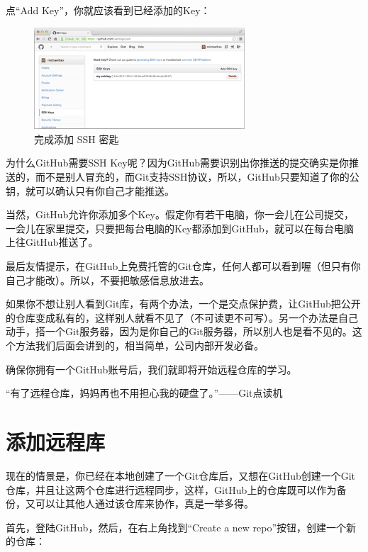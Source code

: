 点“Add Key”，你就应该看到已经添加的Key：

\begin{figure}[h]
  \centering
  \includegraphics[width=0.7\textwidth]{img/github-addkey-2.png}
  \caption{完成添加 SSH 密匙}
  \label{fig:mesh1}
\end{figure}

为什么GitHub需要SSH Key呢？因为GitHub需要识别出你推送的提交确实是你推送的，而不是别人冒充的，而Git支持SSH协议，所以，GitHub只要知道了你的公钥，就可以确认只有你自己才能推送。

当然，GitHub允许你添加多个Key。假定你有若干电脑，你一会儿在公司提交，一会儿在家里提交，只要把每台电脑的Key都添加到GitHub，就可以在每台电脑上往GitHub推送了。

最后友情提示，在GitHub上免费托管的Git仓库，任何人都可以看到喔（但只有你自己才能改）。所以，不要把敏感信息放进去。

如果你不想让别人看到Git库，有两个办法，一个是交点保护费，让GitHub把公开的仓库变成私有的，这样别人就看不见了（不可读更不可写）。另一个办法是自己动手，搭一个Git服务器，因为是你自己的Git服务器，所以别人也是看不见的。这个方法我们后面会讲到的，相当简单，公司内部开发必备。

确保你拥有一个GitHub账号后，我们就即将开始远程仓库的学习。


\begin{tcolorbox}

“有了远程仓库，妈妈再也不用担心我的硬盘了。”——Git点读机
\end{tcolorbox}

\section{添加远程库}
现在的情景是，你已经在本地创建了一个Git仓库后，又想在GitHub创建一个Git仓库，并且让这两个仓库进行远程同步，这样，GitHub上的仓库既可以作为备份，又可以让其他人通过该仓库来协作，真是一举多得。

首先，登陆GitHub，然后，在右上角找到“Create a new repo”按钮，创建一个新的仓库：

